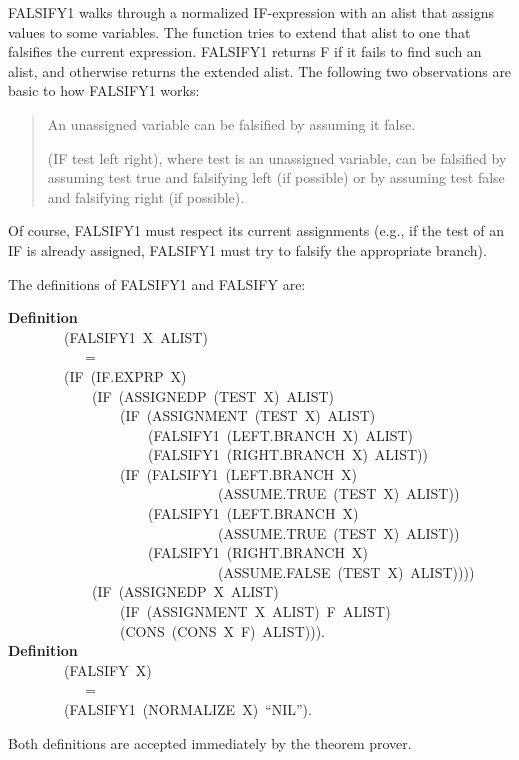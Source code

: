 \documentclass[10pt]{book}
\newenvironment{pubasis}{\begin{flushleft}}{\end{flushleft}}
\newenvironment{pubcrown}{\begin{quote}}{\end{quote}}
\newcommand{\axiomordefinition}[1]{\vspace{6pt}\Large\textsf{\textbf{#1}}\normalsize}
\begin{document}
FALSIFY1 walks through a normalized IF-expression with an alist that
assigns values to some variables.  The function
tries to extend that alist to one that falsifies the current expression.
FALSIFY1 returns F if it
fails to find such an alist, and otherwise returns the
extended alist.  The following two observations
are basic to how FALSIFY1 works:
\begin{pubcrown}
An unassigned variable can be falsified by assuming it false.

(IF test left right), where test is an unassigned variable,
can be falsified by assuming test true and falsifying left (if possible)
or by assuming test false and falsifying right (if possible).
\end{pubcrown}
Of course, FALSIFY1 must respect its current assignments (e.g., if the
test of an IF is already assigned, FALSIFY1 must try to falsify the appropriate
branch).

The definitions of FALSIFY1 and FALSIFY are:
\begin{pubasis}
\axiomordefinition{Definition}\\
~~~~~~~~(FALSIFY1~X~ALIST)\\
~~~~~~~~~~~=\\
~~~~~~~~(IF~(IF.EXPRP~X)\\
~~~~~~~~~~~~(IF~(ASSIGNEDP~(TEST~X)~ALIST)\\
~~~~~~~~~~~~~~~~(IF~(ASSIGNMENT~(TEST~X)~ALIST)\\
~~~~~~~~~~~~~~~~~~~~(FALSIFY1~(LEFT.BRANCH~X)~ALIST)\\
~~~~~~~~~~~~~~~~~~~~(FALSIFY1~(RIGHT.BRANCH~X)~ALIST))\\
~~~~~~~~~~~~~~~~(IF~(FALSIFY1~(LEFT.BRANCH~X)\\
~~~~~~~~~~~~~~~~~~~~~~~~~~~~~~(ASSUME.TRUE~(TEST~X)~ALIST))\\
~~~~~~~~~~~~~~~~~~~~(FALSIFY1~(LEFT.BRANCH~X)\\
~~~~~~~~~~~~~~~~~~~~~~~~~~~~~~(ASSUME.TRUE~(TEST~X)~ALIST))\\
~~~~~~~~~~~~~~~~~~~~(FALSIFY1~(RIGHT.BRANCH~X)\\
~~~~~~~~~~~~~~~~~~~~~~~~~~~~~~(ASSUME.FALSE~(TEST~X)~ALIST))))\\
~~~~~~~~~~~~(IF~(ASSIGNEDP~X~ALIST)\\
~~~~~~~~~~~~~~~~(IF~(ASSIGNMENT~X~ALIST)~F~ALIST)\\
~~~~~~~~~~~~~~~~(CONS~(CONS~X~F)~ALIST))).\\

\axiomordefinition{Definition}\\
~~~~~~~~(FALSIFY~X)\\
~~~~~~~~~~~=\\
~~~~~~~~(FALSIFY1~(NORMALIZE~X)~``NIL'').\\
\end{pubasis}
Both definitions are accepted immediately by the theorem prover.
\end{document}
